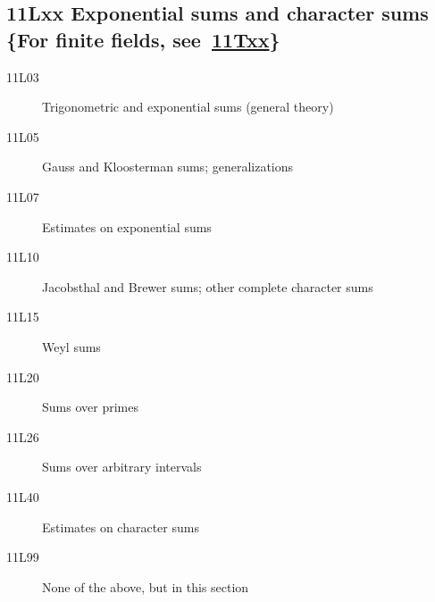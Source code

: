 \subsection*{11Lxx  Exponential sums and character sums \{For finite fields, see~\hyperref[11Txx]{11Txx}\}}\label{11Lxx}
\begin{description}  
\item [11L03]\label{11L03} Trigonometric and exponential sums (general theory)
\item [11L05]\label{11L05} Gauss and Kloosterman sums; generalizations
\item [11L07]\label{11L07} Estimates on exponential sums
\item [11L10]\label{11L10} Jacobsthal and Brewer sums; other complete character sums
\item [11L15]\label{11L15} Weyl sums
\item [11L20]\label{11L20} Sums over primes
\item [11L26]\label{11L26} Sums over arbitrary intervals
\item [11L40]\label{11L40} Estimates on character sums
\item [11L99]\label{11L99} None of the above, but in this section
\end{description}
